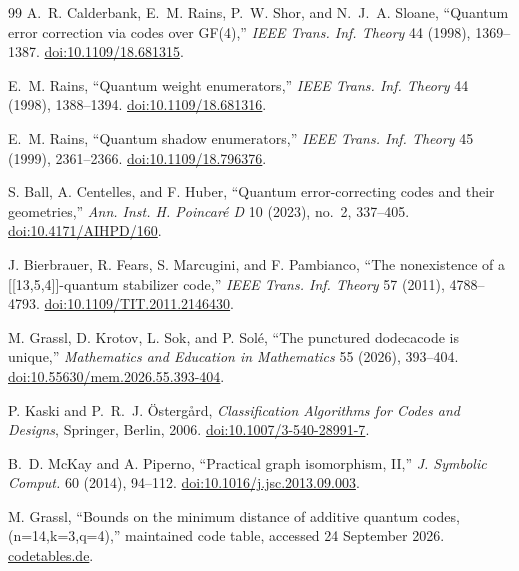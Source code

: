 \documentclass[11pt]{article}
\begin{document}
\begin{thebibliography}{99}
A.~R. Calderbank, E.~M. Rains, P.~W. Shor, and N.~J.~A. Sloane,
``Quantum error correction via codes over GF(4),''
\emph{IEEE Trans. Inf. Theory} 44 (1998), 1369--1387.
\href{https://doi.org/10.1109/18.681315}{doi:10.1109/18.681315}.

E.~M. Rains, ``Quantum weight enumerators,''
\emph{IEEE Trans. Inf. Theory} 44 (1998), 1388--1394.
\href{https://doi.org/10.1109/18.681316}{doi:10.1109/18.681316}.

E.~M. Rains, ``Quantum shadow enumerators,''
\emph{IEEE Trans. Inf. Theory} 45 (1999), 2361--2366.
\href{https://doi.org/10.1109/18.796376}{doi:10.1109/18.796376}.

S. Ball, A. Centelles, and F. Huber, ``Quantum error-correcting codes and their geometries,''
\emph{Ann. Inst. H. Poincaré D} 10 (2023), no.~2, 337--405.
\href{https://doi.org/10.4171/AIHPD/160}{doi:10.4171/AIHPD/160}.

J. Bierbrauer, R. Fears, S. Marcugini, and F. Pambianco,
``The nonexistence of a [[13,5,4]]-quantum stabilizer code,''
\emph{IEEE Trans. Inf. Theory} 57 (2011), 4788--4793.
\href{https://doi.org/10.1109/TIT.2011.2146430}{doi:10.1109/TIT.2011.2146430}.

M. Grassl, D. Krotov, L. Sok, and P. Solé,
``The punctured dodecacode is unique,''
\emph{Mathematics and Education in Mathematics} 55 (2026), 393--404.
\href{https://doi.org/10.55630/mem.2026.55.393-404}{doi:10.55630/mem.2026.55.393-404}.

P. Kaski and P.~R.~J. \"Osterg\aa rd,
\emph{Classification Algorithms for Codes and Designs},
Springer, Berlin, 2006.
\href{https://doi.org/10.1007/3-540-28991-7}{doi:10.1007/3-540-28991-7}.

B.~D. McKay and A. Piperno, ``Practical graph isomorphism, II,''
\emph{J. Symbolic Comput.} 60 (2014), 94--112.
\href{https://doi.org/10.1016/j.jsc.2013.09.003}{doi:10.1016/j.jsc.2013.09.003}.

M. Grassl, ``Bounds on the minimum distance of additive quantum codes, (n=14,k=3,q=4),''
maintained code table, accessed 24 September 2026.
\href{https://codetables.de/QECC.php?k=3&n=14&q=4}{codetables.de}.
\end{thebibliography}
\end{document}
